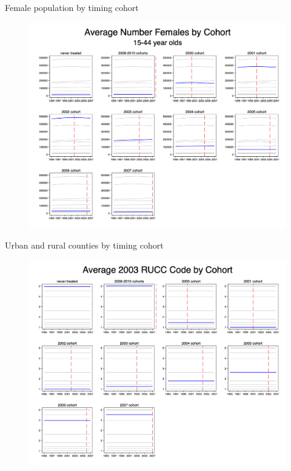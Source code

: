 \documentclass{beamer}
\begin{document}
\begin{frame}{Female population by timing cohort}

\begin{figure}
    \centering
    \includegraphics[height=0.85\textheight]{./lecture_includes/pretty_fempop}
\end{figure}

\end{frame}


\begin{frame}{Urban and rural counties by timing cohort}

\begin{figure}
    \centering
    \includegraphics[height=0.85\textheight]{./lecture_includes/pretty_RUCC}
\end{figure}

\end{frame}
\end{document}
